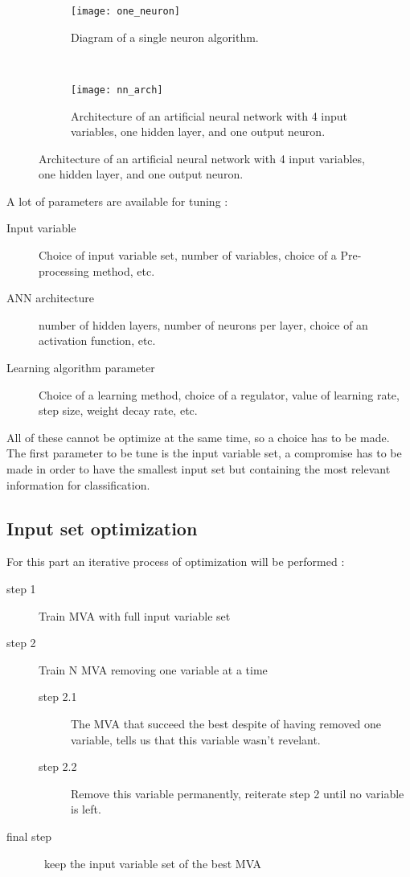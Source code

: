 \begin{figure}[h!]
\centering
    \begin{subfigure}[h!]{0.6\textwidth}
    \centering
    	\texttt{[image: one\_neuron]}
    	\caption{Diagram of a single neuron algorithm.}
    	\label{one_neuron}
	\end{subfigure}
	~
    \begin{subfigure}[h!]{0.35\textwidth}
    \centering
    	\texttt{[image: nn\_arch]}
    	\caption{Architecture of an artificial neural network with 4 input variables, one hidden layer, and one output neuron.}
    	\label{nn_arch}
	\end{subfigure}
\end{figure}


A lot of parameters are available for tuning :
\begin{description}
    \item [Input variable] Choice of input variable set, number of variables, choice of a Pre-processing method, etc.
    \item [ANN architecture] number of hidden layers, number of neurons per layer, choice of an activation function, etc.
    \item [Learning algorithm parameter] Choice of a learning method, choice of a regulator, value of learning rate, step size, weight decay rate, etc.
\end{description}

All of these cannot be optimize at the same time, so a choice has to be made.\\
The first parameter to be tune is the input variable set, a compromise has to be made in order to have the smallest input set but containing the most relevant information for classification.

\subsection{Input set optimization}

For this part an iterative process of optimization will be performed :
\begin{description}
	\item [step 1] Train MVA with full input variable set
	\item [step 2] Train N MVA removing one variable at a time
	\begin{description}
		\item [step 2.1] The MVA that succeed the best despite of having removed one variable, tells us that this variable wasn't revelant.
		\item [step 2.2] Remove this variable permanently, reiterate step 2 until no variable is left.
	\end{description}
	\item [final step] keep the input variable set of the best MVA
\end{description}

